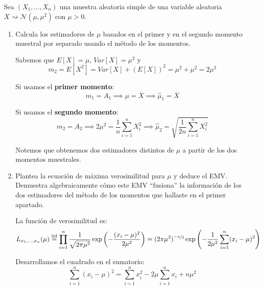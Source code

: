 \begin{ejercicio}
    Sea $(X_1, \dots, X_n)$ una muestra aleatoria simple de una variable aleatoria $X \rightsquigarrow \mathcal{N}(\mu, \mu^2)$ con $\mu > 0$.
    \begin{enumerate}
        \item Calcula los estimadores de $\mu$ basados en el primer y en el segundo momento muestral por separado usando el método de los momentos.
        
        Sabemos que $E[X] = \mu$, $Var[X] = \mu^2$ y
        \begin{equation*}
            m_2 = E[X^2] = Var[X] + (E[X])^2 = \mu^2 + \mu^2 = 2\mu^2
        \end{equation*}

        Si usamos el \textbf{primer momento}:
        \begin{equation*}
            m_1 = A_1 \implies \mu = \overline{X} \implies \widehat{\mu}_1 = \overline{X}
        \end{equation*}

        Si usamos el \textbf{segundo momento}:
        \begin{equation*}
            m_2 = A_2 \implies 2\mu^2 = \frac{1}{n}\sum_{i=1}^n X_i^2 \implies \widehat{\mu}_2 = \sqrt{\frac{1}{2n}\sum_{i=1}^n X_i^2}
        \end{equation*}

        Notemos que obtenemos dos estimadores distintos de $\mu$ a partir de los dos momentos muestrales.


        \item Plantea la ecuación de máxima verosimilitud para $\mu$ y deduce el EMV. Demuestra algebraicamente cómo este EMV ``fusiona'' la información de los dos estimadores del método de los momentos que hallaste en el primer apartado.
        
        La función de verosimilitud es:
        \begin{equation*}
            L_{x_1,\hdots,x_n}(\mu) \overset{\text{iid}}{=} \prod_{i=1}^n \frac{1}{\sqrt{2\pi\mu^2}} \exp\left( -\frac{(x_i - \mu)^2}{2\mu^2} \right) = (2\pi\mu^2)^{\nicefrac{-n}{2}} \exp\left( -\frac{1}{2\mu^2} \sum_{i=1}^n (x_i - \mu)^2 \right)
        \end{equation*}

        Desarrollamos el cuadrado en el sumatorio: 
        \begin{equation*}
            \sum_{i=1}^n (x_i - \mu)^2 = \sum_{i=1}^n x_i^2 - 2\mu \sum_{i=1}^n x_i + n\mu^2
        \end{equation*}


\end{enumerate}
\end{ejercicio}
